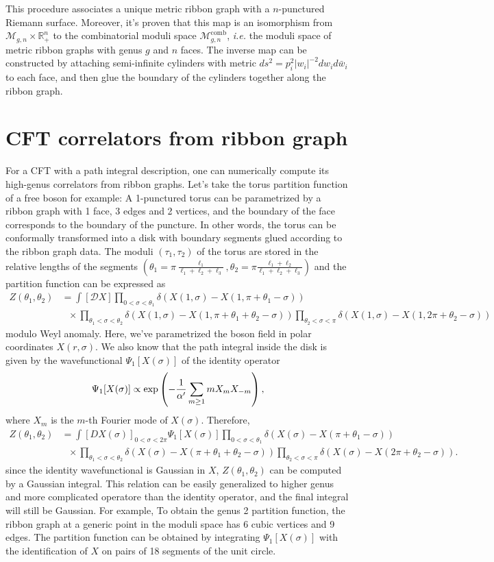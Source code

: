 \documentclass[12pt,letterpaper]{article}
\def\ie{\begin{equation}\begin{aligned}}
\def\fe{\end{aligned}\end{equation}}
\numberwithin{equation}{section}
\newcommand{\A}{{\alpha}}
\begin{document}
This procedure associates a unique metric ribbon graph with a $n$-punctured Riemann surface. Moreover, it's proven that this map is an isomorphism from $\mathcal{M}_{g,n}\times \mathbb{R}_+^n$ to the combinatorial moduli space $\mathcal{M}_{g,n}^\text{comb}$, \textit{i.e.} the moduli space of metric ribbon graphs with genus $g$ and $n$ faces. The inverse map can be constructed by attaching semi-infinite cylinders with metric $ds^2= p_i^2 |w_i|^{-2}dw_i d\bar{w}_i$ to each face, and then glue the boundary of the cylinders together along the ribbon graph.

\section{CFT correlators from ribbon graph}

For a CFT with a path integral description, one can numerically compute its high-genus correlators from ribbon graphs. Let's take the torus partition function of a free boson for example: A 1-punctured torus can be parametrized by a ribbon graph with 1 face, 3 edges and 2 vertices, and the boundary of the face corresponds to the boundary of the puncture. In other words, the torus can be conformally transformed into a disk with boundary segments glued according to the ribbon graph data. The moduli $(\tau_1, \tau_2)$ of the torus are stored in the relative lengths of the segments $(\theta_1=\pi\frac{\ell_1}{\ell_1+\ell_2+\ell_3}, \theta_2=\pi\frac{\ell_1+\ell_2}{\ell_1+\ell_2+\ell_3})$ and the partition function can be expressed as
\ie
Z(\theta_1, \theta_2)&=\int [\mathcal{D}X] \prod_{0<\sigma<\theta_1} \delta(X(1,\sigma)-X(1,\pi+\theta_1-\sigma))
\\
&~~~\times \prod_{\theta_1<\sigma< \theta_2} \delta(X(1,\sigma)-X(1,\pi+\theta_1+\theta_2 - \sigma))  \prod_{\theta_2<\sigma< \pi} \delta(X(1,\sigma)-X(1,2\pi+\theta_2 - \sigma))
\fe
modulo Weyl anomaly. Here, we've parametrized the boson field in polar coordinates $X(r,\sigma)$. We also know that the path integral inside the disk is given by the wavefunctional $\Psi_1[X(\sigma)]$ of the identity operator
\ie\label{psionefx}
\Psi_1[X(\sigma)] \propto \exp\left( - {1\over \A'}\sum_{m\geq 1} m X_m X_{-m} \right),
\fe
where $X_m$ is the $m$-th Fourier mode of $X(\sigma)$. Therefore,
\ie\label{zthetas}
Z(\theta_1, \theta_2) &= \int [DX(\sigma)]_{0<\sigma<2\pi} \Psi_1[X(\sigma)] \prod_{0<\sigma<\theta_1} \delta(X(\sigma)-X(\pi+\theta_1-\sigma))
\\
&~~~\times \prod_{\theta_1<\sigma< \theta_2} \delta(X(\sigma)-X(\pi+\theta_1+\theta_2 - \sigma))  \prod_{\theta_2<\sigma< \pi} \delta(X(\sigma)-X(2\pi+\theta_2 - \sigma)).
\fe
since the identity wavefunctional is Gaussian in $X$, $Z(\theta_1, \theta_2)$ can be computed by a Gaussian integral. This relation can be easily generalized to higher genus and more complicated operatore than the identity operator, and the final integral will still be Gaussian. For example, To obtain the genus 2 partition function, the ribbon graph at a generic point in the moduli space has 6 cubic vertices and 9 edges. The partition function can be obtained by integrating $\Psi_1[X(\sigma)]$ with the identification of $X$ on pairs of 18 segments of the unit circle.
\end{document}
